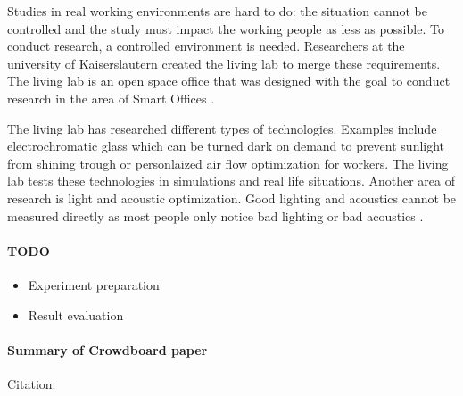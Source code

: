 \documentclass[english]{tktltiki}
\begin{document}
Studies in real working environments are hard to do: the situation cannot be controlled and the 
study must impact the working people as less as possible. To conduct research, a controlled 
environment is needed. Researchers at the university of Kaiserslautern created the living lab to 
merge these requirements. The living lab is an open space office that was designed with the goal to 
conduct research in the area of Smart Offices \cite{living-lab}.


The living lab has researched different types of technologies. Examples include electrochromatic 
glass which can be turned dark on demand to prevent sunlight from shining trough or personlaized air 
flow optimization for workers. The living lab tests these technologies in simulations and real life 
situations. Another area of research is light and acoustic optimization. Good lighting and acoustics 
cannot be measured directly as most people only notice bad lighting or bad acoustics \cite{living-lab}.


\paragraph{TODO}
\begin{itemize}
  \item Experiment preparation
  \item Result evaluation
\end{itemize}

\paragraph{Summary of Crowdboard paper} Citation: \cite{crowdboard}
\end{document}
